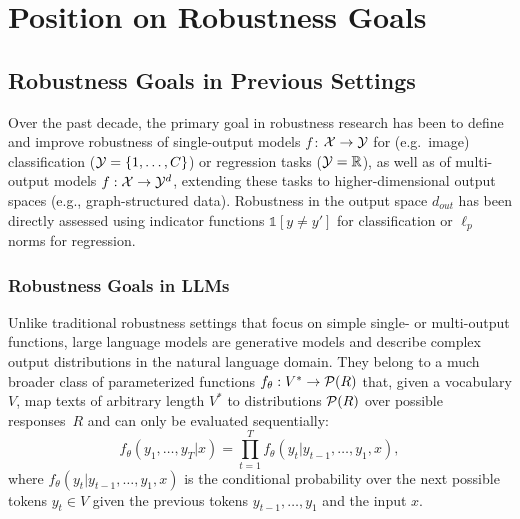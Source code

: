 



\vspace{-10pt}
\section{Position on Robustness Goals}


\subsection{Robustness Goals in Previous Settings}\label{sec:pos-goals-definition}

Over the past decade, the primary goal in robustness research has been to define and improve robustness of single-output models $f\,$$:$$\, {\mathcal{X}} \rightarrow {\mathcal{Y}}$ for (e.g.\ image) classification (${\mathcal{Y}} = \{1, \ldots, C\}$) or regression tasks (${\mathcal{Y}}={\mathbb{R}}$), as well as of multi-output models $f : {\mathcal{X}} \rightarrow {\mathcal{Y}}^d$, extending these tasks to higher-dimensional output spaces (e.g., graph-structured data).
Robustness in the output space $d_{out}$ has been directly assessed using indicator functions $\mathds{1}[y \neq y']$ for classification or $\ell_p$ norms for regression.

\vspace{-7pt}
\subsubsection{Robustness Goals in LLMs}\label{sec:pos-goals-definition-llm}
Unlike traditional robustness settings that focus on simple single- or multi-output functions, large language models are generative models and describe complex output distributions in the natural language domain. They belong to a much broader class of parameterized functions $f_\theta: V^* \rightarrow {\mathcal{P}}(R)$ that, given a vocabulary $V$, map texts of arbitrary length $V^*$ to distributions ${\mathcal{P}}(R)$ over possible responses~$R$ and can only be evaluated sequentially: 
$$f_\theta(y_1, \ldots, y_T | x) = \prod_{t=1}^T f_\theta(y_t | y_{t-1}, \ldots, y_1, x),$$ 
where $f_\theta(y_t| y_{t-1}, \ldots, y_1, x)$ is the conditional probability over the next possible tokens $y_t\in V$ given the previous tokens $y_{t-1}, \ldots, y_1$ and the input $x$. 

